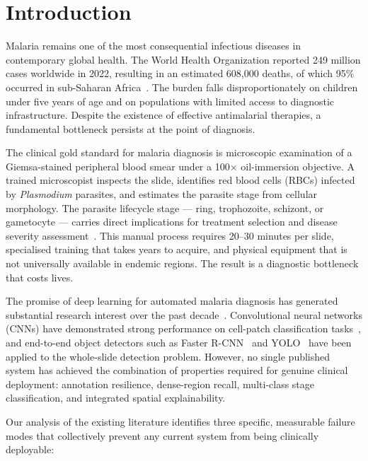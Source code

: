 \documentclass[10pt,twocolumn]{article}
\begin{document}
\newpage

\section{Introduction}
\label{sec:intro}

Malaria remains one of the most consequential infectious diseases in
contemporary global health. The World Health Organization reported 249
million cases worldwide in 2022, resulting in an estimated 608,000 deaths,
of which 95\% occurred in sub-Saharan Africa~\cite{who2023}. The burden
falls disproportionately on children under five years of age and on
populations with limited access to diagnostic infrastructure. Despite the
existence of effective antimalarial therapies, a fundamental bottleneck
persists at the point of diagnosis.

The clinical gold standard for malaria diagnosis is microscopic examination
of a Giemsa-stained peripheral blood smear under a 100$\times$ oil-immersion
objective. A trained microscopist inspects the slide, identifies red blood
cells (RBCs) infected by \textit{Plasmodium} parasites, and estimates the
parasite stage from cellular morphology. The parasite lifecycle stage ---
ring, trophozoite, schizont, or gametocyte --- carries direct implications
for treatment selection and disease severity assessment~\cite{delves2012}.
This manual process requires 20--30 minutes per slide, specialised training
that takes years to acquire, and physical equipment that is not universally
available in endemic regions. The result is a diagnostic bottleneck that
costs lives.

The promise of deep learning for automated malaria diagnosis has generated
substantial research interest over the past decade~\cite{poostchi2018}.
Convolutional neural networks (CNNs) have demonstrated strong performance
on cell-patch classification tasks~\cite{rajaraman2019, singh2025}, and
end-to-end object detectors such as Faster R-CNN~\cite{ren2015} and
YOLO~\cite{yolov4malaria2024} have been applied to the whole-slide detection
problem. However, no single published system has achieved the combination
of properties required for genuine clinical deployment: annotation resilience,
dense-region recall, multi-class stage classification, and integrated
spatial explainability.

Our analysis of the existing literature identifies three specific, measurable
failure modes that collectively prevent any current system from being
clinically deployable:
\end{document}
